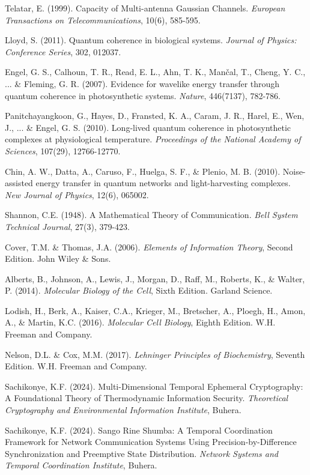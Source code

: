 \documentclass[12pt,a4paper]{article}
\begin{document}
\begin{thebibliography}{99}
Telatar, E. (1999). Capacity of Multi-antenna Gaussian Channels. \textit{European Transactions on Telecommunications}, 10(6), 585-595.

Lloyd, S. (2011). Quantum coherence in biological systems. \textit{Journal of Physics: Conference Series}, 302, 012037.

Engel, G. S., Calhoun, T. R., Read, E. L., Ahn, T. K., Mančal, T., Cheng, Y. C., ... \& Fleming, G. R. (2007). Evidence for wavelike energy transfer through quantum coherence in photosynthetic systems. \textit{Nature}, 446(7137), 782-786.

Panitchayangkoon, G., Hayes, D., Fransted, K. A., Caram, J. R., Harel, E., Wen, J., ... \& Engel, G. S. (2010). Long-lived quantum coherence in photosynthetic complexes at physiological temperature. \textit{Proceedings of the National Academy of Sciences}, 107(29), 12766-12770.

Chin, A. W., Datta, A., Caruso, F., Huelga, S. F., \& Plenio, M. B. (2010). Noise-assisted energy transfer in quantum networks and light-harvesting complexes. \textit{New Journal of Physics}, 12(6), 065002.

Shannon, C.E. (1948). A Mathematical Theory of Communication. \textit{Bell System Technical Journal}, 27(3), 379-423.

Cover, T.M. \& Thomas, J.A. (2006). \textit{Elements of Information Theory}, Second Edition. John Wiley \& Sons.

Alberts, B., Johnson, A., Lewis, J., Morgan, D., Raff, M., Roberts, K., \& Walter, P. (2014). \textit{Molecular Biology of the Cell}, Sixth Edition. Garland Science.

Lodish, H., Berk, A., Kaiser, C.A., Krieger, M., Bretscher, A., Ploegh, H., Amon, A., \& Martin, K.C. (2016). \textit{Molecular Cell Biology}, Eighth Edition. W.H. Freeman and Company.

Nelson, D.L. \& Cox, M.M. (2017). \textit{Lehninger Principles of Biochemistry}, Seventh Edition. W.H. Freeman and Company.

Sachikonye, K.F. (2024). Multi-Dimensional Temporal Ephemeral Cryptography: A Foundational Theory of Thermodynamic Information Security. \textit{Theoretical Cryptography and Environmental Information Institute}, Buhera.

Sachikonye, K.F. (2024). Sango Rine Shumba: A Temporal Coordination Framework for Network Communication Systems Using Precision-by-Difference Synchronization and Preemptive State Distribution. \textit{Network Systems and Temporal Coordination Institute}, Buhera.

\end{thebibliography}
\end{document}
